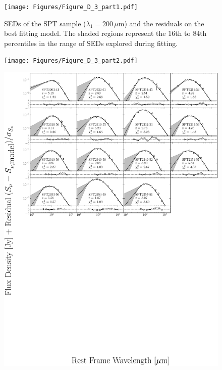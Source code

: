 \begin{figure}
	\centering
	\caption[SEDs of SPT sample ($\lambda_1 = 200\,\mu$m)]{SEDs of the SPT sample ($\lambda_1 = 200\,\mu$m) and the residuals on the best fitting model. The shaded regions represent the $16$th to $84$th percentiles in the range of SEDs explored during fitting.}
	\texttt{[image: Figures/Figure\_D\_3\_part1.pdf]}
\end{figure}
\begin{figure}
	\centering
	\texttt{[image: Figures/Figure\_D\_3\_part2.pdf]}
\end{figure}
\begin{figure}
	\centering
	\includegraphics[width=\columnwidth]{Figures/Figure_D_3_part3.pdf}
\end{figure}
